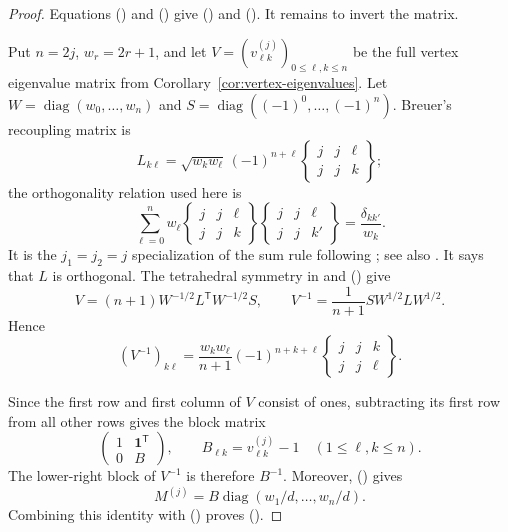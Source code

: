\documentclass[twoside,10pt]{article}
\numberwithin{equation}{section}
\theoremstyle{slbody}
\theoremstyle{definition}
\theoremstyle{remark}
\renewcommand{\eqref}[1]{%
  \textup{{\normalfont(\oldstylenums{\ref{#1}}}\normalfont)}}
\begin{document}
\begin{proof}
Equations \eqref{eq:dissipator-simplified} and
\eqref{eq:a-lk} give \eqref{eq:M-definition} and
\eqref{eq:lambda-M-gamma}.  It remains to invert the matrix.

Put \(n=2j\), \(w_r=2r+1\), and let
\(V=(v^{(j)}_{\ell k})_{0\leq\ell,k\leq n}\) be the full vertex
eigenvalue matrix from Corollary~\ref{cor:vertex-eigenvalues}.  Let
\(W=\operatorname{diag}(w_0,\ldots,w_n)\) and
\(S=\operatorname{diag}((-1)^0,\ldots,(-1)^n)\).  Breuer's
recoupling matrix is
\begin{equation*}
 L_{k\ell}=\sqrt{w_kw_\ell}\,(-1)^{n+\ell}
 \begin{Bmatrix}j&j&\ell\\j&j&k\end{Bmatrix};
\end{equation*}
the orthogonality relation used here is
\begin{equation}\label{eq:6j-orthogonality}
 \sum_{\ell=0}^n w_\ell
 \begin{Bmatrix}j&j&\ell\\j&j&k\end{Bmatrix}
 \begin{Bmatrix}j&j&\ell\\j&j&k'\end{Bmatrix}
 =\frac{\delta_{kk'}}{w_k}.
\end{equation}
It is the \(j_1=j_2=j\) specialization of the sum rule following
\cite[Eq.~(2.14)]{Breuer2005}; see also
\cite[Sec.~34.5(iv)]{NISTDLMF}.  It says that \(L\) is orthogonal.
The tetrahedral symmetry in \cite[Sec.~34.5(ii)]{NISTDLMF} and
\eqref{eq:vertex-eigenvalues} give
\begin{equation}\label{eq:V-factorization}
 V=(n+1)W^{-1/2}L^{\mathsf T}W^{-1/2}S,
 \qquad
 V^{-1}=\frac1{n+1}SW^{1/2}LW^{1/2}.
\end{equation}
Hence
\begin{equation}\label{eq:V-inverse-entry}
 (V^{-1})_{k\ell}
 =\frac{w_kw_\ell}{n+1}(-1)^{n+k+\ell}
 \begin{Bmatrix}j&j&k\\j&j&\ell\end{Bmatrix}.
\end{equation}

Since the first row and first column of \(V\) consist of ones,
subtracting its first row from all other rows gives the block matrix
\begin{equation*}
 \begin{pmatrix}1&\bm 1^{\mathsf T}\\0&B\end{pmatrix},
 \qquad B_{\ell k}=v^{(j)}_{\ell k}-1
 \quad(1\leq\ell,k\leq n).
\end{equation*}
The lower-right block of \(V^{-1}\) is therefore \(B^{-1}\).  Moreover,
\eqref{eq:dissipator-vertex} gives
\begin{equation*}
 M^{(j)}=B\operatorname{diag}(w_1/d,\ldots,w_n/d).
\end{equation*}
Combining this identity with \eqref{eq:V-inverse-entry} proves
\eqref{eq:M-inverse-formula}.


\end{proof}
\end{document}

